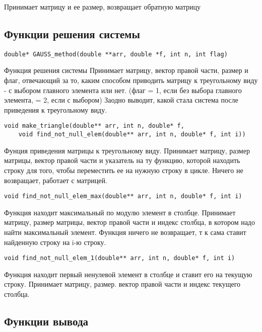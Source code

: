 \documentclass[a4paper,12pt,titlepage,finall]{article}
\begin{document}
Принимает матрицу и ее размер, возвращает обратную матрицу

\subsection{Функции решения системы}

\begin{verbatim}
double* GAUSS_method(double **arr, double *f, int n, int flag)
\end{verbatim}

Функция решения системы
Принимает матрицу, вектор правой части, размер и флаг, отвечающий за то, каким способом приводить матрицу к треугольному виду - с выбором главного элемента или нет. (флаг = 1, если без выбора главного элемента, = 2, если с выбором)
Заодно выводит, какой стала система после приведения к треугольному виду.

\begin{verbatim}
void make_triangle(double** arr, int n, double* f,
    void find_not_null_elem(double** arr, int n, double* f, int i))
\end{verbatim}

Фунция приведения матрицы к треугольному виду.
Принимает матрицу, размер матрицы, вектор правой части и указатель на ту функцию, которой находить строку для того, чтобы переместить ее на нужную строку в цикле. Ничего не возвращает, работает с матрицей.

\begin{verbatim}
void find_not_null_elem_max(double** arr, int n, double* f, int i)
\end{verbatim}

Функция находит максимальный по модулю элемент в столбце.
Принимает матрицу, размер матрицы, вектор правой части и индекс столбца, в котором надо найти максимальный элемент.
Функция ничего не возвращает, т к сама ставит найденную строку на i-ю строку.

\begin{verbatim}
void find_not_null_elem_1(double** arr, int n, double* f, int i)
\end{verbatim}

Функция находит первый ненулевой элемент в столбце и ставит его на текущую строку.
Принимает матрицу, размер. вектор правой части и индекс текущего столбца.

\subsection{Функции вывода}
\end{document}
